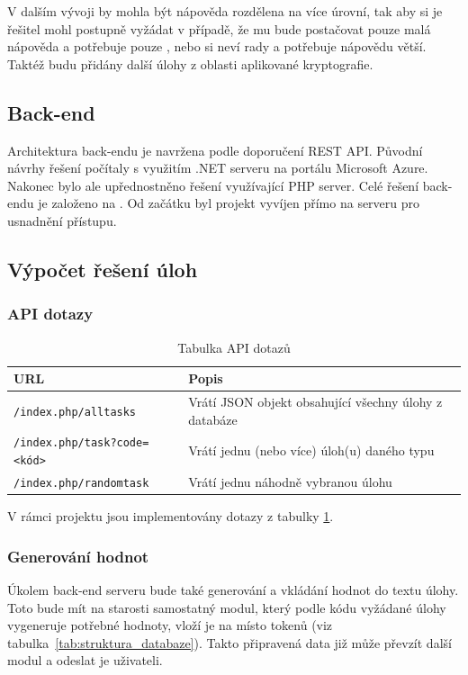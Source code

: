 \documentclass[titlepage]{article}
\begin{document}
V dalším vývoji by mohla být nápověda rozdělena na více úrovní, tak aby si je řešitel mohl postupně vyžádat v případě, že mu bude postačovat pouze malá nápověda a potřebuje pouze , nebo si neví rady a potřebuje nápovědu větší. Taktéž budu přidány další úlohy z oblasti aplikované kryptografie.   

\subsection{Back-end}
Architektura back-endu je navržena podle doporučení REST API. Původní návrhy řešení počítaly s využitím .NET serveru na portálu Microsoft Azure. Nakonec bylo ale upřednostněno řešení využívající PHP server. Celé řešení back-endu je založeno na \cite{restapi}. Od začátku byl projekt vyvíjen přímo na serveru pro usnadnění přístupu. 

\subsection{Výpočet řešení úloh}

\subsubsection{API dotazy}\label{sec:api_dotazy}
\begin{table}[b]
    \centering
    \caption{Tabulka API dotazů}
    \label{tab:api_dotazy}
    \vspace{.5em}
    \begin{tabular}{|l | p{5cm} |}
        \hline
        \textbf{URL} & \textbf{Popis} \\
        \hline \hline
      \texttt{/index.php/alltasks} & Vrátí JSON objekt obsahující všechny úlohy z databáze \\
        \hline
        \texttt{/index.php/task?code=<kód>} & Vrátí jednu (nebo více) úloh(u) daného typu \\
        \hline
        \texttt{/index.php/randomtask} & Vrátí jednu náhodně vybranou úlohu \\
        \hline
    \end{tabular}
\end{table}

V rámci projektu jsou implementovány dotazy z tabulky \ref{tab:api_dotazy}. 

\subsubsection{Generování hodnot}\label{sec:generovani_hodnot}
Úkolem back-end serveru bude také generování a vkládání hodnot do textu úlohy. Toto bude mít na starosti samostatný modul, který podle kódu vyžádané úlohy vygeneruje potřebné hodnoty, vloží je na místo tokenů  (viz tabulka~\ref{tab:struktura_databaze}). Takto připravená data již může převzít další modul a odeslat je uživateli. 
\end{document}
